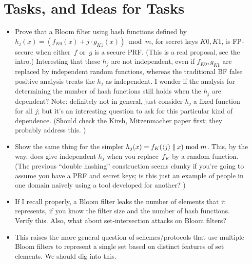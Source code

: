 \section{Tasks, and Ideas for Tasks}

\begin{itemize}
\item Prove that a Bloom filter using hash functions defined by $h_j(x) = \left( f_{K0}(x) + j\cdot g_{K1}(x)\right) \bmod m$, for secret keys $K0,K1$, is FP-secure when either~$f$ or~$g$ is a secure PRF.  (This is a real proposal, see the intro.)  Interesting that these $h_j$ are not independent, even if $f_{K0},g_{K1}$ are replaced by independent random functions, whereas the traditional BF false positive analysis treats the $h_j$ as independent.  I wonder if the analysis for determining the number of hash functions still holds when the $h_j$ are dependent?  Note: definitely not in general, just consider $h_j$ a fixed function for all $j$; but it's an interesting question to ask for this particular kind of dependence.  (Should check the Kirsh, Mitzenmacher paper first; they probably address this. )

\item Show the same thing for the simpler $h_j(x) =
    f_{K}(\langle j \rangle \: \| \: x) \bmod m$.  This, by the
    way, does give independent $h_j$ when you replace~$f_K$ by a
    random function.  (The previous ``double hashing''
    construction seems clunky if you're going to assume you have
    a PRF and secret keys; is this just an example of people in
    one domain naively using a tool developed for another? )

\item  If I recall properly, a Bloom filter leaks the number of elements that it represents, if you know the filter size and the number of hash functions.  Verify this.    Also, what about set-intersection attacks on Bloom filters?
\item This raises the more general question of schemes/protocols that use multiple Bloom filters to represent a single set based on distinct features of set elements.  We should dig into this.


\end{itemize}
